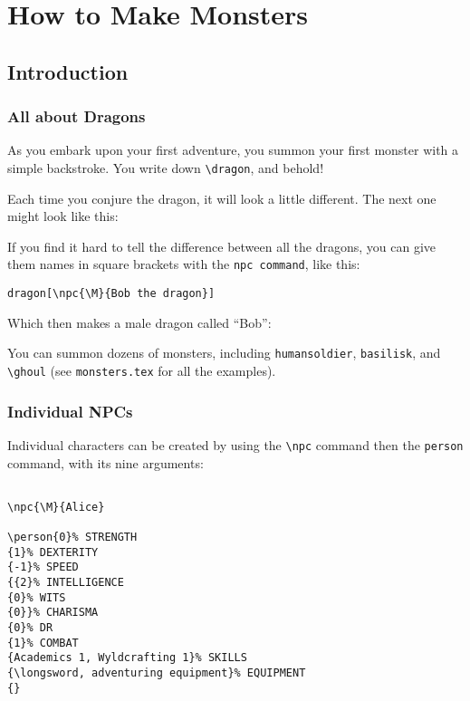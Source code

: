 \documentclass[a4paper,openany]{book}
\date{\today}
\begin{document}
\chapter{How to Make Monsters}

\section{Introduction}

\begin{multicols}{2}

\subsection{All about Dragons}

\begin{boxtext}

As you embark upon your first adventure, you summon your first monster with a simple backstroke.
You write down \verb"\dragon", and behold!

\end{boxtext}

\dragon

Each time you conjure the dragon, it will look a little different.
The next one might look like this:

\dragon

If you find it hard to tell the difference between all the dragons, you can give them names in square brackets with the \verb"npc command", like this:

\verb"dragon[\npc{\M}{Bob the dragon}]"

Which then makes a male dragon called ``Bob'':


You can summon dozens of monsters, including \verb"humansoldier", \verb"basilisk", and \verb"\ghoul"
(see \verb"monsters.tex" for all the examples).

\subsection{Individual NPCs}

Individual characters can be created by using the \verb"\npc" command then the \verb"person" command, with its nine arguments:

\begin{verbatim}

\npc{\M}{Alice}

\person{0}% STRENGTH
{1}% DEXTERITY 
{-1}% SPEED
{{2}% INTELLIGENCE
{0}% WITS
{0}}% CHARISMA
{0}% DR
{1}% COMBAT
{Academics 1, Wyldcrafting 1}% SKILLS
{\longsword, adventuring equipment}% EQUIPMENT
{}


\end{verbatim}
\end{multicols}
\end{document}
